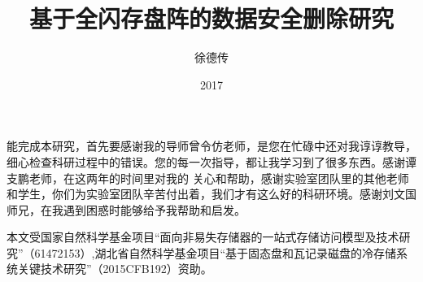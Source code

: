 \documentclass[format=draft,degree=master,language=chinese]{hustthesis}
\title{基于全闪存盘阵的数据安全删除研究}{Research of Secure Deletion based on
  Solid-State Disk Array}
\author{徐德传}{Dechuan Xu}
\date{2017}{5}{27}
\begin{document}
\frontmatter
\maketitle
\makeabstract
\tableofcontents
\listoffigures
\listoftables
\mainmatter






%


\backmatter

\begin{ack}
    能完成本研究，首先要感谢我的导师曾令仿老师，是您在忙碌中还对我谆谆教导，细心检查科研过程中的错误。您的每一次指导，都让我学习到了很多东西。感谢谭支鹏老师，在这两年的时间里对我的
关心和帮助，感谢实验室团队里的其他老师和学生，你们为实验室团队辛苦付出着，我们才有这么好的科研环境。感谢刘文国师兄，在我遇到困惑时能够给予我帮助和启发。


    本文受国家自然科学基金项目“面向非易失存储器的一站式存储访问模型及技术研究”（61472153）,湖北省自然科学基金项目“基于固态盘和瓦记录磁盘的冷存储系统关键技术研究”（2015CFB192）资助。
\end{ack}



\end{document}
